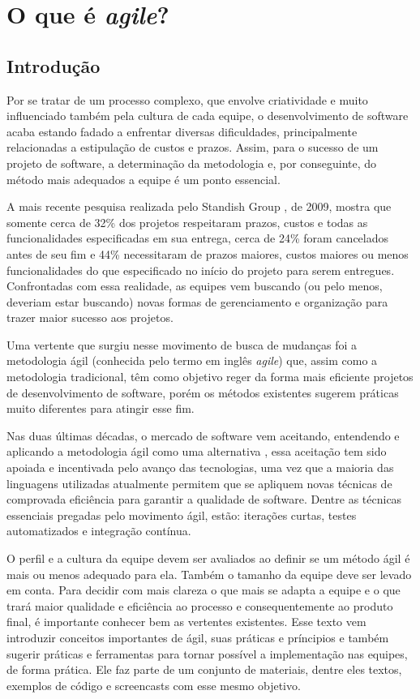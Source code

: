 \documentclass[a4paper,11pt,abntfigtabnum,noindentfirst]{abnt}
\begin{document}
\chapter{O que é \textsl{agile}?}

\section {Introdução}

Por se tratar de um processo complexo, que envolve criatividade e muito influenciado também pela cultura de cada equipe, o desenvolvimento de software acaba estando fadado a enfrentar diversas dificuldades, principalmente relacionadas a estipulação de custos e prazos. Assim, para o sucesso de um projeto de software, a determinação da metodologia e, por conseguinte, do método mais adequados a equipe é um ponto essencial.

A mais recente pesquisa realizada pelo Standish Group , de 2009, mostra que somente cerca de 32\% dos projetos respeitaram prazos, custos e todas as funcionalidades especificadas em sua entrega, cerca de 24\% foram cancelados antes de seu fim e 44\% necessitaram de prazos maiores, custos maiores ou menos funcionalidades do que especificado no início do projeto para serem entregues. Confrontadas com essa realidade, as equipes vem buscando (ou pelo menos, deveriam estar buscando) novas formas de gerenciamento e organização para trazer maior sucesso aos projetos.

Uma vertente que surgiu nesse movimento de busca de mudanças foi a metodologia ágil (conhecida pelo termo em inglês \textsl{agile}) que, assim como a metodologia tradicional, têm como objetivo reger da forma mais eficiente projetos de desenvolvimento de software, porém os métodos existentes sugerem práticas muito diferentes para atingir esse fim.

Nas duas últimas décadas, o mercado de software vem aceitando, entendendo e aplicando a metodologia ágil como uma alternativa , essa aceitação tem sido apoiada e incentivada pelo avanço das tecnologias, uma vez que a maioria das linguagens utilizadas atualmente permitem que se apliquem novas técnicas de comprovada eficiência para garantir a qualidade de software. Dentre as técnicas essenciais pregadas pelo movimento ágil, estão: iterações curtas, testes automatizados e integração contínua.

O perfil e a cultura da equipe devem ser avaliados ao definir se um método ágil é mais ou menos adequado para ela. Também o tamanho da equipe deve ser levado em conta. Para decidir com mais clareza o que mais se adapta a equipe e o que trará maior qualidade e eficiência ao processo e consequentemente ao produto final, é importante conhecer bem as vertentes existentes. Esse texto vem introduzir conceitos importantes de ágil, suas práticas e príncipios e também sugerir práticas e ferramentas para tornar possível a implementação nas equipes, de forma prática. Ele faz parte de um conjunto de materiais, dentre eles textos, exemplos de código e screencasts com esse mesmo objetivo.
\end{document}
